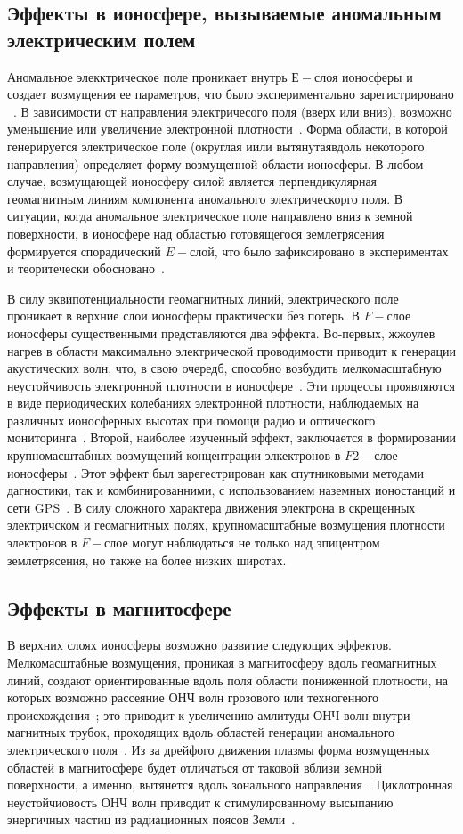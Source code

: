 \documentclass[12pt, oneside, a4paper]{article}
\begin{document}
\subsection{Эффекты в ионосфере, вызываемые аномальным электрическим полем}
Аномальное элекктрическое поле проникает внутрь $Е-$слоя ионосферы и создает возмущения ее параметров, что было экспериментально зарегистрировано ~\cite{Liperovsky:2000}. В зависимости от направления электричесого поля (вверх или вниз), возможно уменьшение или увеличение электронной плотности~\cite{Pulinets:1998}. Форма области, в которой генерируется электрическое поле (округлая иили вытянутаявдоль некоторого направления) определяет форму возмущенной области ионосферы. В любом случае,   возмущающей ионосферу силой является перпендикулярная геомагнитным линиям компонента аномального электрическорго поля. В ситуации, когда аномальное электрическое поле направлено вниз к земной поверхности, в ионосфере над областью готовящегося землетрясения формируется спорадический $E-$слой, что было зафиксировано в экспериментах~\cite{Ondoh_Hayakawa:1999} и теоритечески обосновано~\cite{Kim:1994}.

В силу эквипотенциальности геомагнитных линий, электрического поле проникает в верхние слои ионосферы практически без потерь. В $F-$слое ионосферы существенными представляются два эффекта. Во-первых, жжоулев нагрев в области максимально электрической проводимости  приводит к генерации акустических волн, что, в свою очередб, способно возбудить мелкомасштабную неустойчивость электронной плотности в ионосфере~\cite{Hegai:1997}. Эти процессы проявляются в виде периодических колебаниях электронной плотности, наблюдаемых на различных ионосферных высотах при помощи радио и оптического мониторинга~\cite{Chmyrev:1997}. Второй, наиболее изученный эффект, заключается в формировании крупномасштабных возмущений концентрации элкектронов в $F2-$слое ионосферы~\cite{Pulinets_Legenka:2003}. Этот эффект был зарегестрирован как спутниковыми методами дагностики, так и комбинированними, с использованием наземных ионостанций и сети GPS~\cite{Lui:2004}. В силу сложного характера движения электрона в скрещенных электричском и геомагнитных полях, крупномасштабные возмущения плотности электронов в $F-$слое могут наблюдаться  не только над  эпицентром землетрясения, но также на более низких широтах. 
\subsection{Эффекты в магнитосфере}
В верхних слоях ионосферы возможно развитие следующих эффектов. Мелкомасштабные возмущения, проникая в магнитосферу вдоль геомагнитных линий, создают ориентированные вдоль поля области пониженной плотности, на которых возможно рассеяние ОНЧ волн грозового или техногенного происхождения~\cite{Kim_Hegai:1997}; это приводит к увеличению амлитуды ОНЧ волн внутри магнитных трубок, проходящих вдоль областей генерации аномального электрического поля~\cite{Shklyar_Nagano:1998}. Из за дрейфого движения плазмы форма возмущенных областей в магнитосфере будет отличаться от таковой вблизи земной поверхности, а именно, вытянется вдоль зонального направления~\cite{Kim_Hegai:1997}. Циклотронная неустойчиовость ОНЧ волн приводит к стимулированному высыпанию  энергичных частиц из радиационных поясов Земли~\cite{Galper:1995}.
\end{document}
